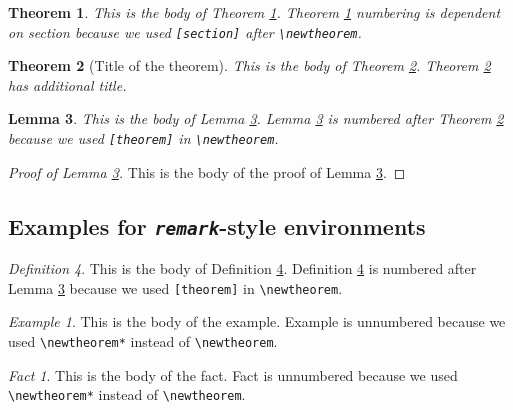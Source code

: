 \documentclass[aoas]{imsart}
\numberwithin{equation}{section}
\theoremstyle{plain}
\newtheorem{theorem}{Theorem}[section]
\newtheorem{lemma}[theorem]{Lemma}
\theoremstyle{remark}
\newtheorem{definition}[theorem]{Definition}
\newtheorem*{example}{Example}
\newtheorem*{fact}{Fact}
\begin{document}
\begin{theorem}
\label{th1} This is the body of Theorem \ref{th1}. Theorem \ref{th1}
numbering is dependent on section because we used \verb|[section]| after
\verb|\newtheorem|.

\end{theorem}

\begin{theorem}[Title of the theorem]
\label{th2} This is the body of Theorem \ref{th2}. Theorem \ref{th2} has
additional title.

\end{theorem}

\begin{lemma}
\label{le1} This is the body of Lemma \ref{le1}. Lemma \ref{le1} is
numbered after Theorem \ref{th2} because we used \verb|[theorem]| in
\verb|\newtheorem|.

\end{lemma}

\begin{proof}[Proof of Lemma \ref{le1}]
This is the body of the proof of Lemma \ref{le1}.

\end{proof}

\hypertarget{examples-for-remark-style-environments}{%
\subsection{\texorpdfstring{Examples for \emph{\texttt{remark}}-style
environments}{Examples for remark-style environments}}\label{examples-for-remark-style-environments}}

\begin{definition}
\label{de1} This is the body of Definition \ref{de1}. Definition
\ref{de1} is numbered after Lemma \ref{le1} because we used
\verb|[theorem]| in \verb|\newtheorem|.

\end{definition}

\begin{example}
This is the body of the example. Example is unnumbered because we used
\verb|\newtheorem*| instead of \verb|\newtheorem|.

\end{example}

\begin{fact}
This is the body of the fact. Fact is unnumbered because we used
\verb|\newtheorem*| instead of \verb|\newtheorem|.

\end{fact}
\end{document}
